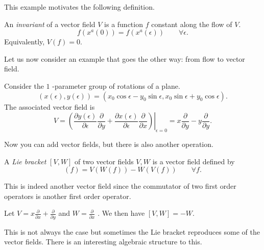 This example motivates the following definition.
\begin{definition}[invariant]
  An \emph{invariant} of a vector field $V$ is a function $f$ constant along the flow of $V$.
  \begin{equation}
    f(x^{a}(0)) = f(x^{a}(\epsilon)) \qquad \forall \epsilon.
  \end{equation}
  Equivalently, $V(f) = 0$.
\end{definition}

Let us now consider an example that goes the other way: from flow to vector field.
\begin{example}
  Consider the $1$ -parameter group of rotations of a plane.
  \begin{equation}
    (x( \epsilon), y(\epsilon)) = (x_0 \cos\epsilon - y_0 \sin \epsilon, x_0 \sin \epsilon + y_0 \cos \epsilon).
  \end{equation}
  The associated vector field is
  \begin{equation}
  V = \left.\left( \frac{\partial y(\epsilon)}{\partial \epsilon} \frac{\partial }{\partial y} + \frac{\partial x(\epsilon)}{\partial \epsilon} \frac{\partial }{\partial x} \right)\right\rvert_{\epsilon = 0} = x \frac{\partial }{\partial y} - y \frac{\partial }{\partial y}.
  \end{equation}
\end{example}

Now you can add vector fields, but there is also another operation.
\begin{definition}
  A \emph{Lie bracket} $[V, W]$ of two vector fields $V, W$ is a vector field defined by
  \begin{equation}
    [V, W](f) = V(W(f)) - W(V(f)) \qquad \forall f.
  \end{equation}
\end{definition}
\begin{leftbar}
  This is indeed another vector field since the commutator of two first order operators is another first order operator.
\end{leftbar}

\begin{example}[]
  Let $V = x \frac{\partial }{\partial x} + \frac{\partial }{\partial y}$  and $W = \frac{\partial }{\partial x}$ . We then have $[V, W] = - W$.
\end{example}
This is not always the case but sometimes the Lie bracket reproduces some of the vector fields. There is an interesting algebraic structure to this.

